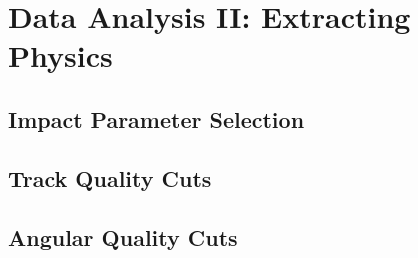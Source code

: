 \chapter{Data Analysis II: Extracting Physics}
\section{Impact Parameter Selection}
\section{Track Quality Cuts}
\section{Angular Quality Cuts}

